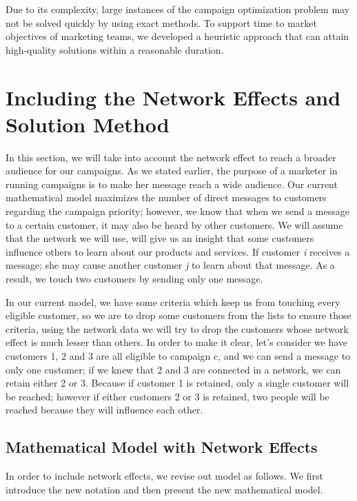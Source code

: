 \documentclass[11pt]{article}
\begin{document}
Due to its complexity, large instances of the campaign optimization problem may not be solved quickly by using exact methods. To support time to market objectives of marketing teams, we developed a heuristic approach that can attain high-quality solutions within a reasonable duration.


\section{Including the Network Effects and Solution Method} \label{s:net-effect}
In this section, we will take into account the network effect to reach a broader audience for our campaigns. As we stated earlier, the purpose of a marketer in running campaigns is to make her message reach a wide audience. Our current mathematical model maximizes the number of direct messages to customers regarding the campaign priority; however, we know that when we send a message to a certain customer, it may also be heard by other customers. We will assume that the network we will use, will give us an insight that some customers influence others to learn about our products and services. If customer \textit{i} receives a message; she may cause another customer \textit{j} to learn about that message. As a result, we touch two customers by sending only one message.

In our current model, we have some criteria which keep us from touching every eligible customer, so we are to drop some customers from the lists to ensure those criteria, using the network data we will try to drop the customers whose network effect is much lesser than others. In order to make it clear, let's consider we have customers 1, 2 and 3 are all eligible to campaign c, and we can send a message to only one customer; if we knew that 2 and 3 are connected in a network, we can retain either 2 or 3. Because if customer 1 is retained, only a single customer will be reached; however if either customers 2 or 3 is retained, two people will be reached because they will influence each other.

\subsection{Mathematical Model with Network Effects} \label{s:network-modif-model}
In order to include network effects, we revise out model as follows. We first introduce the new notation and then present the new mathematical model.
\\
\end{document}
